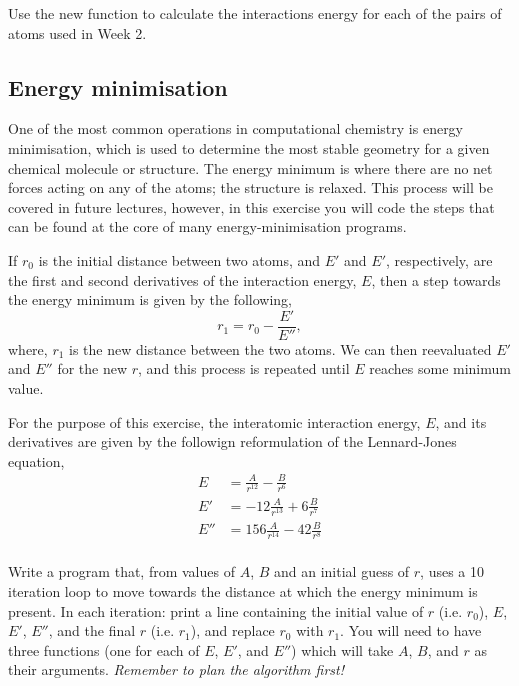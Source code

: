 \documentclass[a4paper]{article}
\begin{document}
Use the new function to calculate the interactions energy for each of the pairs of atoms used in Week 2.

\subsection{Energy minimisation}

One of the most common operations in computational chemistry is energy minimisation, which is used to determine the most stable geometry for a given chemical molecule or structure.
The energy minimum is where there are no net forces acting on any of the atoms; the structure is relaxed.
This process will be covered in future lectures, however, in this exercise you will code the steps that can be found at the core of many energy-minimisation programs.

If $r_0$ is the initial distance between two atoms, and $E'$ and $E'$, respectively, are the first and second derivatives of the interaction energy, $E$, then a step towards the energy minimum is given by the following,
\begin{equation}
  r_1 = r_0 - \frac{E'}{E''},
\end{equation}
where, $r_1$ is the new distance between the two atoms.
We can then reevaluated $E'$ and $E''$ for the new $r$, and this process is repeated until $E$ reaches some minimum value.

For the purpose of this exercise, the interatomic interaction energy, $E$, and its derivatives are given by the followign reformulation of the Lennard-Jones equation,
\begin{equation}
  \begin{aligned}
    E & = \frac{A}{r^{12}} - \frac{B}{r^6} \\
    E' & = -12\frac{A}{r^{13}} + 6\frac{B}{r^7} \\
    E'' & = 156\frac{A}{r^{14}} - 42\frac{B}{r^8} \\
  \end{aligned}
\end{equation}

Write a program that, from values of $A$, $B$ and an initial guess of $r$, uses a 10 iteration loop to move towards the distance at which the energy minimum is present.
In each iteration: print a line containing the initial value of $r$ (i.e. $r_0$), $E$, $E'$, $E''$, and the final $r$ (i.e. $r_1$), and replace $r_0$ with $r_1$.
You will need to have three functions (one for each of $E$, $E'$, and $E''$) which will take $A$, $B$, and $r$ as their arguments.
\emph{Remember to plan the algorithm first!}
\end{document}

